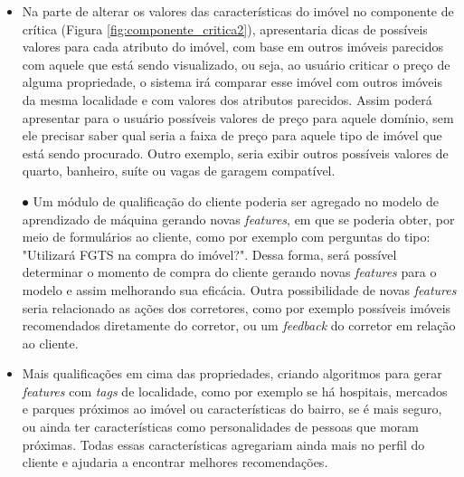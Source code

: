 \begin{itemize}
  \item Na parte de alterar os valores das características do imóvel no componente de crítica (Figura \ref{fig:componente_critica2}), apresentaria dicas de possíveis valores para cada atributo do imóvel, com base em outros imóveis parecidos com aquele que está sendo visualizado, ou seja, ao usuário criticar o preço de alguma propriedade, o sistema irá comparar esse imóvel com outros imóveis da mesma localidade e com valores dos atributos parecidos. Assim poderá apresentar para o usuário possíveis valores de preço para aquele domínio, sem ele precisar saber qual seria a faixa de preço para aquele tipo de imóvel que está sendo procurado. Outro exemplo, seria exibir outros possíveis valores de quarto, banheiro, suíte ou vagas de garagem compatível.

 
 ⦁	Um módulo de qualificação do cliente poderia ser agregado no modelo de aprendizado de máquina gerando novas \textit{features}, em que se poderia obter, por meio de formulários ao cliente, como por exemplo com perguntas do tipo: "Utilizará FGTS na compra do imóvel?". Dessa forma, será possível determinar o momento de compra do cliente gerando novas \textit{features} para o modelo e assim melhorando sua eficácia. Outra possibilidade de novas \textit{features} seria relacionado as ações dos corretores, como por exemplo possíveis imóveis recomendados diretamente do corretor, ou um \textit{feedback} do corretor em relação ao cliente.
  

\item Mais qualificações em cima das propriedades, criando algoritmos para gerar \textit{features} com \textit{tags} de localidade, como por exemplo se há hospitais, mercados e parques próximos ao imóvel ou características do bairro, se é mais seguro, ou ainda ter características como personalidades de pessoas que moram próximas. Todas essas características agregariam ainda mais no perfil do cliente e ajudaria a encontrar melhores recomendações.
\end{itemize}

